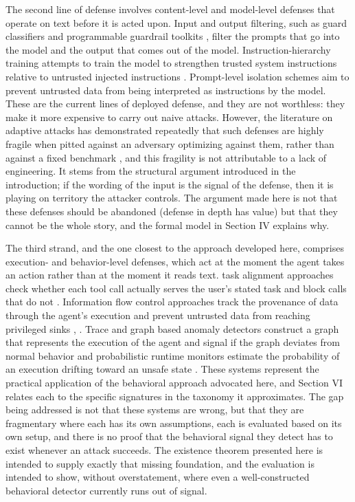 \documentclass[journal]{IEEEtran}
\theoremstyle{remark}
\begin{document}
The second line of defense involves content-level and model-level defenses that operate on text before it is acted upon. Input and output filtering, such as guard classifiers and programmable guardrail toolkits \cite{r1}\cite{r2}, filter the prompts that go into the model and the output that comes out of the model. Instruction-hierarchy training attempts to train the model to strengthen trusted system instructions relative to untrusted injected instructions \cite{r28}. Prompt-level isolation schemes aim to prevent untrusted data from being interpreted as instructions by the model. These are the current lines of deployed defense, and they are not worthless: they make it more expensive to carry out naive attacks. However, the literature on adaptive attacks has demonstrated repeatedly that such defenses are highly fragile when pitted against an adversary optimizing against them, rather than against a fixed benchmark \cite{r5}, and this fragility is not attributable to a lack of engineering. It stems from the structural argument introduced in the introduction; if the wording of the input is the signal of the defense, then it is playing on territory the attacker controls. The argument made here is not that these defenses should be abandoned (defense in depth has value) but that they cannot be the whole story, and the formal model in Section IV explains why.

The third strand, and the one closest to the approach developed here, comprises execution- and behavior-level defenses, which act at the moment the agent takes an action rather than at the moment it reads text. task alignment approaches check whether each tool call actually serves the user's stated task and block calls that do not \cite{r13}. Information flow control approaches track the provenance of data through the agent's execution and prevent untrusted data from reaching privileged sinks \cite{r15}, \cite{r16}. Trace and graph based anomaly detectors construct a graph that represents the execution of the agent and signal if the graph deviates from normal behavior \cite{r14,r19} and probabilistic runtime monitors estimate the probability of an execution drifting toward an unsafe state \cite{r20}. These systems represent the practical application of the behavioral approach advocated here, and Section VI relates each to the specific signatures in the taxonomy it approximates. The gap being addressed is not that these systems are wrong, but that they are fragmentary where each has its own assumptions, each is evaluated based on its own setup, and there is no proof that the behavioral signal they detect has to exist whenever an attack succeeds. The existence theorem presented here is intended to supply exactly that missing foundation, and the evaluation is intended to show, without overstatement, where even a well-constructed behavioral detector currently runs out of signal.
\end{document}
